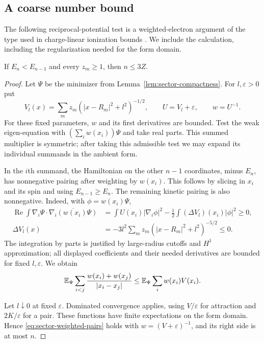 \subsection{A coarse number bound}

The following reciprocal-potential test is a weighted-electron argument
of the type used in charge-linear ionization bounds \citep{Lieb1984}.
We include the calculation, including the regularization needed for the
form domain.

\begin{lemma}
\label{lem:sector-crude}
If $E_n<E_{n-1}$ and every $z_m\geq1$, then $n\leq3Z$.
\end{lemma}

\begin{proof}
Let $\Psi$ be the minimizer from Lemma~\ref{lem:sector-compactness}.
For $l,\varepsilon>0$ put
\[
 V_l(x)=\sum_m z_m(|x-R_m|^2+l^2)^{-1/2},\qquad
 U=V_l+\varepsilon,\qquad w=U^{-1}.
\]
For these fixed parameters, $w$ and its first derivatives are bounded.
Test the weak eigen-equation with
$(\sum_iw(x_i))\Psi$ and take real parts.  This summed multiplier is
symmetric; after taking this admissible test we may expand its
individual summands in the ambient form.

In the $i$th summand, the Hamiltonian on the other $n-1$ coordinates,
minus $E_n$, has nonnegative pairing after weighting by $w(x_i)$.
This follows by slicing in $x_i$ and its spin and using
$E_{n-1}\geq E_n$.  The remaining kinetic pairing is also
nonnegative.  Indeed, with $\phi=w(x_i)\Psi$,
\begin{align*}
 \operatorname{Re}\int\nabla_i\Psi\cdot
              \overline{\nabla_i(w(x_i)\Psi)}
 &=\int U(x_i)|\nabla_i\phi|^2
          -\frac12\int(\Delta V_l)(x_i)|\phi|^2\geq0,\\
 \Delta V_l(x)&=-3l^2\sum_m
              z_m(|x-R_m|^2+l^2)^{-5/2}\leq0.
\end{align*}
The integration by parts is justified by large-radius cutoffs and
$H^1$ approximation; all displayed coefficients and their needed
derivatives are bounded for fixed $l,\varepsilon$.  We obtain
\begin{equation}\label{eq:sector-weighted-pairs}
 \mathbb E_\Psi\sum_{i<j}\frac{w(x_i)+w(x_j)}{|x_i-x_j|}
 \leq\mathbb E_\Psi\sum_iw(x_i)V(x_i).
\end{equation}

Let $l\downarrow0$ at fixed $\varepsilon$.  Dominated convergence
applies, using $V/\varepsilon$ for attraction and
$2K/\varepsilon$ for a pair.  These functions have finite expectations
on the form domain.  Hence \eqref{eq:sector-weighted-pairs} holds with
$w=(V+\varepsilon)^{-1}$, and its right side is at most $n$.


\end{proof}
